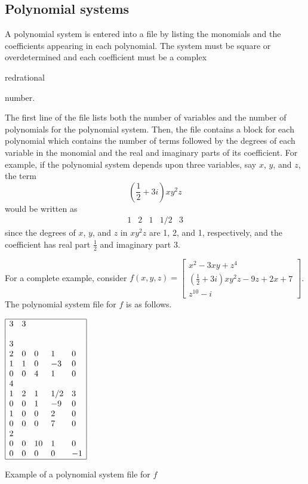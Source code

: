 \documentclass[11pt]{report}
\begin{document}
\subsection{Polynomial systems}\label{SEC:PolySys}

A polynomial system is entered into a file
by listing the monomials and the coefficients appearing in each polynomial.
The system must be square or overdetermined and each
coefficient must be a complex \begin{color}{red}rational\end{color} number.

The first line of the file lists both the number of variables and the number of
polynomials for the polynomial system.  Then, the file contains a block for each polynomial
which contains the number of terms followed by the degrees of
each variable in the monomial and the real and imaginary parts of its coefficient.
For example, if the polynomial system depends upon three variables, say $x$, $y$, and $z$,
the term
$$\left(\frac{1}{2} + 3i\right) xy^2z$$
would be written as
$$\begin{array}{ccccc}
1 & 2 & 1 & 1/2 & 3
\end{array}$$
since the degrees of $x$, $y$, and $z$ in $xy^2z$ are 1, 2, and 1, respectively,
and the coefficient has real part $\displaystyle\frac{1}{2}$ and imaginary part $3$.

For a complete example, consider $f(x,y,z) = \left[\begin{array}{c} x^2 - 3xy + z^4 \\
\left(\frac{1}{2} + 3i\right) xy^2z - 9 z + 2x + 7\\ z^{10} - i \end{array}\right]$.
The polynomial system file for $f$ is as follows.

\begin{table}[h!]
\centering
$\begin{array}{|lllll|}
\hline
3 & 3 & & & \\
& & & & \\
3 & & & & \\
2 & 0 & 0 & 1  & 0 \\
1 & 1 & 0 & -3 & 0 \\
0 & 0 & 4 & 1  & 0 \\
4 & & & & \\
1 & 2 & 1 & 1/2 & 3 \\
0 & 0 & 1 & -9 & 0 \\
1 & 0 & 0 & 2 & 0 \\
0 & 0 & 0 & 7 & 0 \\
2 & & & & \\
0 & 0 & 10 & 1 & 0 \\
0 & 0 & 0 & 0 & -1 \\
\hline
\end{array}$
\caption{Example of a polynomial system file for $f$}\label{Tab:PolySys}
\end{table}
\end{document}
